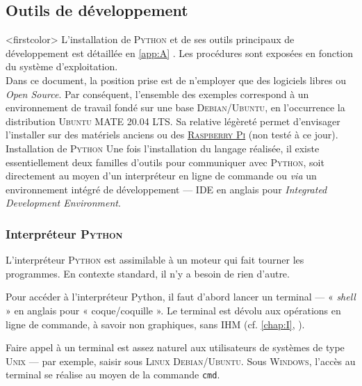 \subsection[Outils de développement]{Outils de développement}
\label{sec:X.1.2}

\caution[t]<firstcolor>{%
L'installation de \textsc{Python} et de ses outils principaux de développement est détaillée en \cref{app:A} . Les procédures sont exposées en fonction du système d'exploitation.\\
Dans ce document, la position prise est de n'employer que des logiciels libres ou \textit{Open Source}. Par conséquent, l'ensemble des exemples correspond à un environnement de travail fondé sur une base \textsc{Debian}/\textsc{Ubuntu}, en l'occurrence la distribution \textsc{Ubuntu MATE} 20.04 LTS. Sa relative légèreté permet d'envisager l'installer sur des matériels anciens ou des \href{https://ubuntu-mate.org/download/}{\textsc{Raspberry Pi}} (non testé à ce jour).}%
{Installation de \textsc{Python}}%
Une fois l'installation du langage réalisée, il existe essentiellement deux familles d'outils pour communiquer avec \textsc{Python}, soit directement au moyen d'un interpréteur en ligne de commande ou \textit{via} un environnement intégré de développement --- IDE en anglais pour \textit{Integrated Development Environment}.

\subsubsection[Interpréteur \textsc{Python}]{Interpréteur \textsc{Python}}
\label{subsub:X.1.2.1}

L'interpréteur \textsc{Python} est assimilable à un moteur qui fait tourner les programmes. En contexte standard, il n'y a besoin de rien d'autre.

Pour accéder à l'interpréteur Python, il faut d'abord lancer un terminal --- « \textit{shell} » en anglais pour « coque/coquille ». Le terminal est dévolu aux opérations en ligne de commande, à savoir non graphiques, sans IHM (cf. \cref{chap:I}, ).

Faire appel à un terminal est assez naturel aux utilisateurs de systèmes de type \textsc{Unix} --- par exemple, saisir  sous \textsc{Linux} \textsc{Debian}/\textsc{Ubuntu}. Sous \textsc{Windows}, l'accès au terminal se réalise au moyen de la commande \texttt{cmd}.


